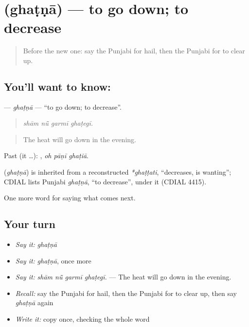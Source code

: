 \section[\texorpdfstring{\pa{ਘਟਣਾ} (ghaṭṇā)}{ਘਟਣਾ (ghaṭṇā)}]{ (ghaṭṇā) — to go down; to decrease}

\label{lesson:PA-C290-ghatna}



\begin{quote}
Before the new one: say the Punjabi for hail, then the Punjabi for to clear up.
\end{quote}

\subsection*{You'll want to know: }
\textbf{} — \emph{ghaṭṇā} — \textquotedblleft{}to go down; to decrease\textquotedblright{}.

\begin{quote}
   
\end{quote}

\begin{quote}
\emph{shām nū̃ garmī ghaṭegī.}
\end{quote}

\begin{quote}
The heat will go down in the evening.
\end{quote}

Past (it …):   , \emph{oh pāṇī ghaṭiā}.

\begin{cousinweb}
\textbf{} (\emph{ghaṭṇā}) is inherited from a reconstructed \emph{*ghaṭṭati}, \textquotedblleft{}decreases, is wanting\textquotedblright{}; CDIAL lists Punjabi \emph{ghaṭṇā}, \textquotedblleft{}to decrease\textquotedblright{}, under it (CDIAL 4415).
\end{cousinweb}

\begin{grammarlens}[title={What you've built}]
One more word for saying what comes next.
\end{grammarlens}

\subsection*{Your turn}
\begin{itemize}
\raggedright
  \item \emph{Say it:} \emph{ghaṭṇā}
  \item \emph{Say it:} \emph{ghaṭṇā}, once more
  \item \emph{Say it:} \emph{shām nū̃ garmī ghaṭegī.} — The heat will go down in the evening.
  \item \emph{Recall:} say the Punjabi for hail, then the Punjabi for to clear up, then say \emph{ghaṭṇā} again
  \item \emph{Write it:} copy \textbf{} once, checking the whole word
\end{itemize}

